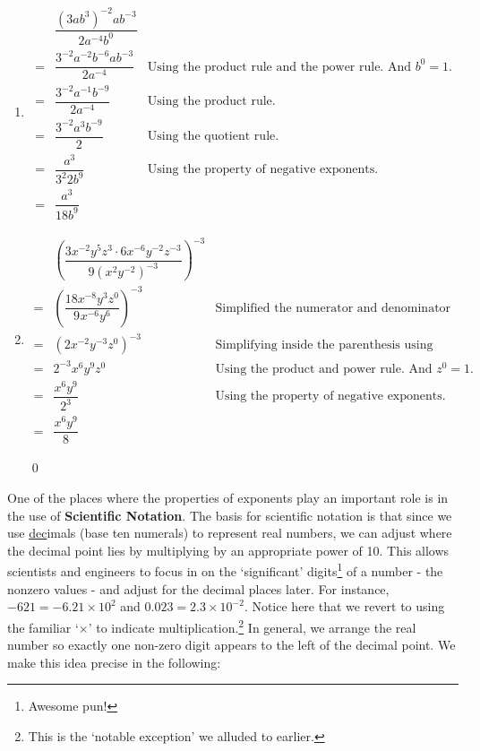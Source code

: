 \begin{ex}
\begin{enumerate}
\item \[
\begin{array}{cll}
& \dfrac{(3 {ab}^3)^{- 2} {ab}^{- 3}}{2 a^{- 4} b^0} & \\[8pt]
= & \dfrac{3^{- 2} a^{- 2} b^{- 6} {ab}^{- 3}}{2 a^{- 4}} & \text{Using the product rule and the power rule. And $b^0=1$.}\\[8pt]
= & \dfrac{3^{- 2} a^{- 1} b^{- 9}}{2 a^{- 4}} & \text{Using the product rule.}\\[8pt]
= & \dfrac{3^{- 2} a^3 b^{- 9}}{2} &  \text{Using the quotient rule.}\\[8pt]
= & \dfrac{a^3}{3^2 2 b^9} & \text{Using the property of negative exponents.} \\[8pt]
= & \dfrac{a^3}{18 b^9} & 
\end{array}
\]

\item \[
\begin{array}{cll}
& \left( \dfrac{3 x^{- 2} y^5 z^3 \cdot 6 x^{- 6} y^{- 2} z^{- 3}}{9 (x^2y^{- 2})^{- 3}} \right)^{- 3} &  \text{}\\[8pt]
= & \left( \dfrac{18 x^{- 8} y^3 z^0}{9^{} x^{- 6} y^6} \right)^{- 3} &  \text{Simplified the numerator and denominator using the product rule.}\\[8pt]
= & (2 x^{- 2} y^{- 3} z^0)^{- 3} & \text{Simplifying inside the parenthesis using the quotient rule}\\[8pt]
= & 2^{- 3} x^6 y^9 z^0 & \text{Using the product and power rule. And $z^0 = 1$.}\\[8pt]
= & \dfrac{x^6 y^9}{2^3} & \text{Using the property of negative exponents.}\\[8pt]
= & \dfrac{x^6 y^9}{8} &
\end{array}
\]

\vspace{-.3in} \qed
\end{enumerate}
\end{ex}


\medskip


One of the places where the properties of exponents play an important role is in the use of \textbf{Scientific Notation}.  The basis for scientific notation is that since we use \underline{dec}imals (base ten numerals) to represent real numbers, we can adjust where the decimal point lies by multiplying by an appropriate power of 10.  This allows scientists and engineers to focus in on the `significant' digits\footnote{Awesome pun!} of a number - the nonzero values - and adjust for the decimal places later.  For instance, $-621 = -6.21 \times 10^2$ and $0.023 = 2.3 \times 10^{-2}$.  Notice here that we revert to using the familiar `$\times$' to indicate multiplication.\footnote{This is the `notable exception' we alluded to earlier.}   In general, we arrange the real number so exactly one non-zero digit appears to the left of the decimal point.  We make this idea precise in the following: 

